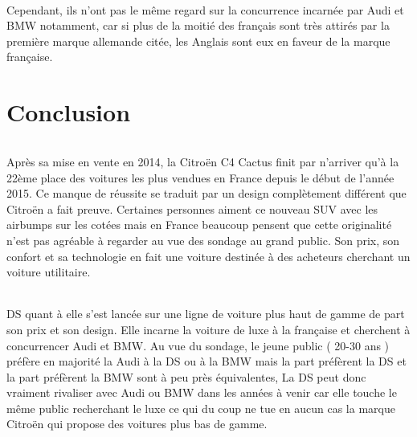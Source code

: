 \documentclass[12pt]{article}\usepackage[]{graphicx}\usepackage[]{color}
\begin{document}
\paragraph{} Cependant, ils n'ont pas le même regard sur la concurrence
incarnée par Audi et BMW notamment, car si plus de la moitié des français sont
très attirés par la première marque allemande citée, les Anglais sont eux en
faveur de la marque française.

\part{Conclusion}

\paragraph{} Après sa mise en vente en 2014, la Citroën C4 Cactus finit par
n'arriver qu'à la 22ème place des voitures les plus vendues en France depuis le
début de l'année 2015. Ce manque de réussite se traduit par un design
complètement différent que Citroën a fait preuve. Certaines personnes aiment ce
nouveau SUV avec les airbumps sur les cotées mais en France beaucoup pensent
que cette originalité n'est pas agréable à regarder au vue des sondage au grand
public. Son prix, son confort et sa technologie en fait une voiture destinée à
des acheteurs cherchant un voiture utilitaire.

\paragraph{} DS quant à elle s'est lancée sur une ligne de voiture plus haut de
gamme de part son prix et son design. Elle incarne la voiture de luxe à la
française et cherchent à concurrencer Audi et BMW.  Au vue du sondage, le jeune
public ( 20-30 ans ) préfère en majorité la Audi à la DS ou à la BMW mais la
part préfèrent la DS et la part préfèrent la BMW sont à peu près équivalentes,
La DS peut donc vraiment rivaliser avec Audi ou BMW dans les années à venir car
elle touche le même public recherchant le luxe ce qui du coup ne tue en aucun
cas la marque Citroën qui propose des voitures plus bas de gamme.

\printbibliography%
\end{document}
